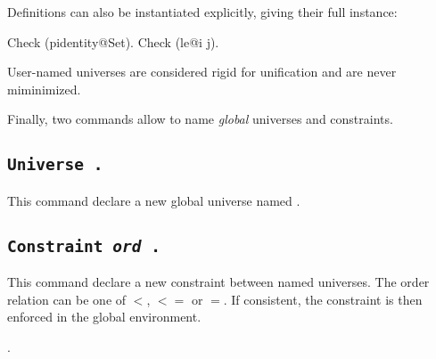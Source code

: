 Definitions can also be instantiated explicitly, giving their full instance:
\begin{coq_example}
Check (pidentity@{Set}).
Check (le@{i j}).
\end{coq_example}

User-named universes are considered rigid for unification and are never
miminimized.

Finally, two commands allow to name \emph{global} universes and constraints.

\subsection{\tt Universe {\ident}.
  \label{UniverseCmd}}

This command declare a new global universe named {\ident}.

\subsection{\tt Constraint {\ident} {\textit{ord}} {\ident}.
  \label{ConstraintCmd}}

This command declare a new constraint between named universes. 
The order relation can be one of $<$, $<=$ or $=$. If consistent, 
the constraint is then enforced in the global environment.

\begin{ErrMsgs}
\item {}.
\item {}
\end{ErrMsgs}

